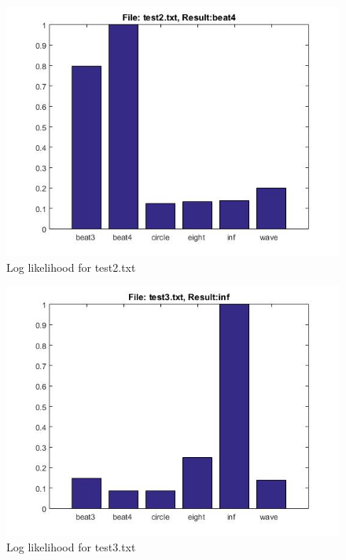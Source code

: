 \documentclass[fleqn,10pt]{SelfArx} %
\begin{document}
\begin{figure}[hbtp]
\centering
\includegraphics[scale=0.45]{test2.jpg}
\caption{Log likelihood for test2.txt}
\label{fig:test2}
\end{figure}

\begin{figure}[hbtp]
\centering
\includegraphics[scale=0.45]{test3.jpg}
\caption{Log likelihood for test3.txt}
\label{fig:test3}
\end{figure}
\end{document}
